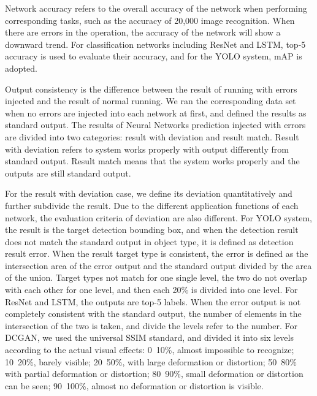 Network accuracy refers to the overall accuracy of the 
network when performing corresponding tasks, such as the 
accuracy of 20,000 image recognition. When there are errors 
in the operation, the accuracy of the network will show a 
downward trend. For classification networks including 
ResNet and LSTM, top-5 accuracy is used to evaluate their 
accuracy, and for the YOLO system, mAP is adopted.

Output consistency is the difference between the result of 
running with errors injected and the result of normal 
running. We ran the corresponding data set when no errors 
are injected into each network at first, and defined the 
results as standard output. The results of Neural Networks 
prediction injected with errors are divided into two 
categories: result with deviation and result match. Result 
with deviation refers to system works properly with output 
differently from standard output. Result match means that 
the system works properly and the outputs are still 
standard output.

For the result with deviation case, we define its deviation 
quantitatively and further subdivide the result. Due to the 
different application functions of each network, the 
evaluation criteria of deviation are also different. For 
YOLO system, the result is the target detection bounding 
box, and when the detection result does not match the 
standard output in object type, it is defined as detection 
result error. When the result target type is consistent, 
the error is defined as the intersection area of the error 
output and the standard output divided by the area of the 
union. Target types not match for one single level, the two 
do not overlap with each other for one level, and then each 
20\% is divided into one level. For ResNet and LSTM, the 
outputs are top-5 labels. When the error output is not 
completely consistent with the standard output, the number 
of elements in the intersection of the two is taken, and 
divide the levels refer to the number. For DCGAN, we used 
the universal SSIM standard, and divided it into six levels 
according to the actual visual effects: 0~10\%, almost 
impossible to recognize; 10~20\%, barely visible; 20~50\%, 
with large deformation or distortion; 50~80\% with partial 
deformation or distortion; 80~90\%, small deformation or 
distortion can be seen; 90~100\%, almost no deformation or 
distortion is visible.

